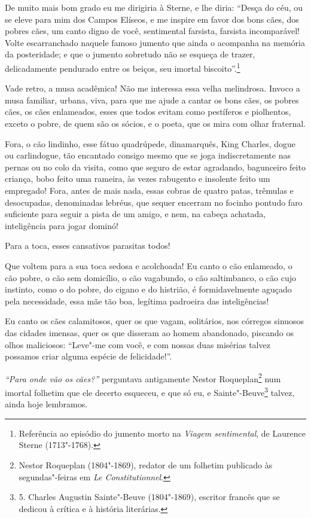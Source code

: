De muito mais bom grado eu me dirigiria à Sterne, e lhe diria:
“Desça do céu, ou se eleve para mim dos Campos Elíseos, e me inspire em favor dos bons cães, dos pobres cães, um
canto digno de você, sentimental farsista, farsista incomparável! Volte
escarranchado naquele famoso jumento que ainda o acompanha na memória
da posteridade; e que o jumento sobretudo não se esqueça de trazer,
delicadamente pendurado entre os beiços, seu imortal
biscoito''.\protect\footnote{ Referência ao episódio do jumento morto na \textit{Viagem sentimental},
de Laurence Sterne (1713"-1768).}

Vade retro, a musa acadêmica! Não me interessa essa velha melindrosa.
Invoco a musa familiar, urbana, viva, para que me ajude a
cantar os bons cães, os pobres cães, os cães enlameados, esses que
todos evitam como pestíferos e piolhentos, exceto o pobre, de quem são
os sócios, e o poeta, que os mira com olhar fraternal.

Fora, o cão lindinho, esse fátuo quadrúpede, dinamarquês, King
Charles, dogue ou carlindogue, tão encantado consigo mesmo que se
joga indiscretamente nas pernas ou no colo da visita, como que seguro de estar agradando, bagunceiro feito criança, bobo feito uma
rameira, às vezes rabugento e insolente feito um empregado! Fora,
antes de mais nada, essas cobras de quatro patas, trêmulas e desocupadas,
denominadas lebréus, que sequer encerram no focinho pontudo faro
suficiente para seguir a pista de um amigo, e nem, na cabeça
achatada, inteligência para jogar dominó!

Para a toca, esses cansativos parasitas todos!

Que voltem para a sua toca sedosa e acolchoada! Eu canto o cão enlameado,
o cão pobre, o cão sem domicílio, o cão vagabundo, o cão saltimbanco, o
cão cujo instinto, como o do pobre, do cigano e do histrião, é
formidavelmente aguçado pela necessidade, essa mãe tão boa, 
legítima padroeira das inteligências!

Eu canto os cães calamitosos, quer os que vagam, solitários, nos
córregos sinuosos das cidades imensas, quer os que disseram ao
homem abandonado, piscando os olhos maliciosos:
“Leve"-me com você, e com nossas duas misérias talvez
possamos criar alguma espécie de felicidade!''.

\textit{“Para onde vão os cães?''} perguntava antigamente
Nestor Roqueplan\protect\footnote{ Nestor Roqueplan (1804"-1869), 
redator de um folhetim publicado às
segundas"-feiras em \textit{Le Constitutionnel}.}
 num imortal folhetim que ele decerto esqueceu, e que 
só eu, e Sainte"-Beuve\protect\footnote{ 5. Charles Augustin 
Sainte"-Beuve (1804"-1869), escritor francês que
se dedicou à crítica e à história literárias.}
talvez, ainda hoje lembramos.

